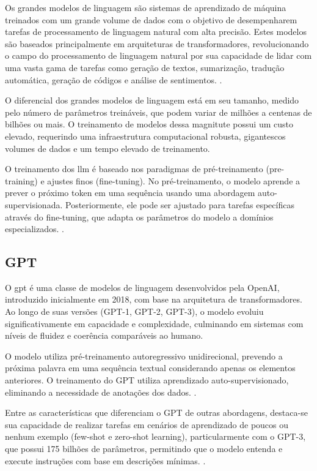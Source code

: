 Os grandes modelos de linguagem são sistemas de aprendizado de máquina treinados com um grande volume de dados com o objetivo de desempenharem tarefas de processamento de linguagem natural com alta precisão. Estes modelos são baseados principalmente em arquiteturas de transformadores, revolucionando o campo do processamento de linguagem natural por sua capacidade de lidar com uma vasta gama de tarefas como geração de textos, sumarização, tradução automática, geração de códigos e análise de sentimentos. \cite{IBMLLM}.

O diferencial dos grandes modelos de linguagem está em seu tamanho, medido pelo número de parâmetros treináveis, que podem variar de milhões a centenas de bilhões ou mais. O treinamento de modelos dessa magnitute possui um custo elevado, requerindo uma infraestrutura computacional robusta, gigantescos volumes de dados e um tempo elevado de treinamento. 

O treinamento dos \gls{llm} é baseado nos paradigmas de pré-treinamento (pre-training) e ajustes finos (fine-tuning). No pré-treinamento, o modelo aprende a prever o próximo token em uma sequência usando uma abordagem auto-supervisionada. Posteriormente, ele pode ser ajustado para tarefas específicas através do fine-tuning, que adapta os parâmetros do modelo a domínios especializados. \cite{Zhou2023}.

\subsection{GPT}\label{subsec:gpt}

O \gls{gpt} é uma classe de modelos de linguagem desenvolvidos pela OpenAI, introduzido inicialmente em 2018, com base na arquitetura de transformadores. Ao longo de suas versões (GPT-1, GPT-2, GPT-3), o modelo evoluiu significativamente em capacidade e complexidade, culminando em sistemas com níveis de fluidez e coerência comparáveis ao humano.

O modelo utiliza pré-treinamento autoregressivo unidirecional, prevendo a próxima palavra em uma sequência textual considerando apenas os elementos anteriores. O treinamento do GPT utiliza aprendizado auto-supervisionado, eliminando a necessidade de anotações dos dados. \cite{Brown2020}.

Entre as características que diferenciam o GPT de outras abordagens, destaca-se sua capacidade de realizar tarefas em cenários de aprendizado de poucos ou nenhum exemplo (few-shot e zero-shot learning), particularmente com o GPT-3, que possui 175 bilhões de parâmetros, permitindo que o modelo entenda e execute instruções com base em descrições mínimas. \cite{Brown2020}.


